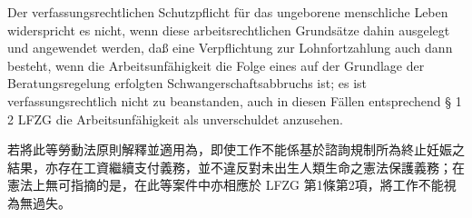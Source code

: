 \documentclass[12pt]{article}
\begin{document}
\begin{sourcepara}[title={原文E.226}]
Der verfassungsrechtlichen Schutzpflicht für das ungeborene menschliche Leben widerspricht es nicht, wenn diese arbeitsrechtlichen Grundsätze dahin ausgelegt und angewendet werden, daß eine Verpflichtung zur Lohnfortzahlung auch dann besteht, wenn die Arbeitsunfähigkeit die Folge eines auf der Grundlage der Beratungsregelung erfolgten Schwangerschaftsabbruchs ist; es ist verfassungsrechtlich nicht zu beanstanden, auch in diesen Fällen entsprechend § 1 \abbrAbs{} 2 LFZG die Arbeitsunfähigkeit als unverschuldet anzusehen.
\end{sourcepara}
\begin{transpara}
若將此等勞動法原則解釋並適用為，即使工作不能係基於諮詢規制所為終止妊娠之結果，亦存在工資繼續支付義務，並不違反對未出生人類生命之憲法保護義務；在憲法上無可指摘的是，在此等案件中亦相應於 LFZG 第1條第2項，將工作不能視為無過失。
\end{transpara}
\end{document}
